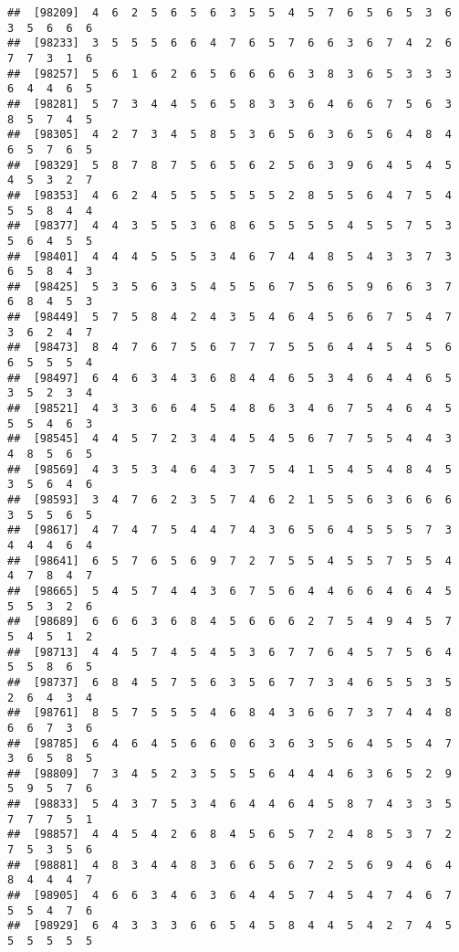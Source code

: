 \documentclass[
]{book}
\begin{document}
\begin{verbatim}
##  [98209]  4  6  2  5  6  5  6  3  5  5  4  5  7  6  5  6  5  3  6  3  5  6  6  6
##  [98233]  3  5  5  5  6  6  4  7  6  5  7  6  6  3  6  7  4  2  6  7  7  3  1  6
##  [98257]  5  6  1  6  2  6  5  6  6  6  6  3  8  3  6  5  3  3  3  6  4  4  6  5
##  [98281]  5  7  3  4  4  5  6  5  8  3  3  6  4  6  6  7  5  6  3  8  5  7  4  5
##  [98305]  4  2  7  3  4  5  8  5  3  6  5  6  3  6  5  6  4  8  4  6  5  7  6  5
##  [98329]  5  8  7  8  7  5  6  5  6  2  5  6  3  9  6  4  5  4  5  4  5  3  2  7
##  [98353]  4  6  2  4  5  5  5  5  5  5  2  8  5  5  6  4  7  5  4  5  5  8  4  4
##  [98377]  4  4  3  5  5  3  6  8  6  5  5  5  5  4  5  5  7  5  3  5  6  4  5  5
##  [98401]  4  4  4  5  5  5  3  4  6  7  4  4  8  5  4  3  3  7  3  6  5  8  4  3
##  [98425]  5  3  5  6  3  5  4  5  5  6  7  5  6  5  9  6  6  3  7  6  8  4  5  3
##  [98449]  5  7  5  8  4  2  4  3  5  4  6  4  5  6  6  7  5  4  7  3  6  2  4  7
##  [98473]  8  4  7  6  7  5  6  7  7  7  5  5  6  4  4  5  4  5  6  6  5  5  5  4
##  [98497]  6  4  6  3  4  3  6  8  4  4  6  5  3  4  6  4  4  6  5  3  5  2  3  4
##  [98521]  4  3  3  6  6  4  5  4  8  6  3  4  6  7  5  4  6  4  5  5  5  4  6  3
##  [98545]  4  4  5  7  2  3  4  4  5  4  5  6  7  7  5  5  4  4  3  4  8  5  6  5
##  [98569]  4  3  5  3  4  6  4  3  7  5  4  1  5  4  5  4  8  4  5  3  5  6  4  6
##  [98593]  3  4  7  6  2  3  5  7  4  6  2  1  5  5  6  3  6  6  6  3  5  5  6  5
##  [98617]  4  7  4  7  5  4  4  7  4  3  6  5  6  4  5  5  5  7  3  4  4  4  6  4
##  [98641]  6  5  7  6  5  6  9  7  2  7  5  5  4  5  5  7  5  5  4  4  7  8  4  7
##  [98665]  5  4  5  7  4  4  3  6  7  5  6  4  4  6  6  4  6  4  5  5  5  3  2  6
##  [98689]  6  6  6  3  6  8  4  5  6  6  6  2  7  5  4  9  4  5  7  5  4  5  1  2
##  [98713]  4  4  5  7  4  5  4  5  3  6  7  7  6  4  5  7  5  6  4  5  5  8  6  5
##  [98737]  6  8  4  5  7  5  6  3  5  6  7  7  3  4  6  5  5  3  5  2  6  4  3  4
##  [98761]  8  5  7  5  5  5  4  6  8  4  3  6  6  7  3  7  4  4  8  6  6  7  3  6
##  [98785]  6  4  6  4  5  6  6  0  6  3  6  3  5  6  4  5  5  4  7  3  6  5  8  5
##  [98809]  7  3  4  5  2  3  5  5  5  6  4  4  4  6  3  6  5  2  9  5  9  5  7  6
##  [98833]  5  4  3  7  5  3  4  6  4  4  6  4  5  8  7  4  3  3  5  7  7  7  5  1
##  [98857]  4  4  5  4  2  6  8  4  5  6  5  7  2  4  8  5  3  7  2  7  5  3  5  6
##  [98881]  4  8  3  4  4  8  3  6  6  5  6  7  2  5  6  9  4  6  4  8  4  4  4  7
##  [98905]  4  6  6  3  4  6  3  6  4  4  5  7  4  5  4  7  4  6  7  5  5  4  7  6
##  [98929]  6  4  3  3  3  6  6  5  4  5  8  4  4  5  4  2  7  4  5  5  5  5  5  5

\end{verbatim}
\end{document}
